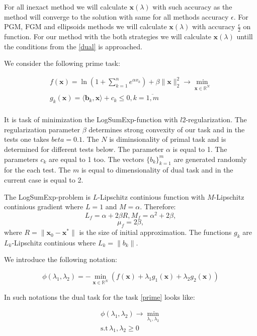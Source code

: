 \documentclass[12pt]{article}
\begin{document}
For all inexact method we will calculate $\textbf{x}(\lambda)$ with such accuracy as the method will converge to the solution with same for all methods accuracy $\epsilon$. For PGM, FGM and ellipsoids methods we will calculate $\textbf{x}(\lambda)$ with accuracy $\frac{\epsilon}{2}$ on function. For our method with the both strategies we will calculate $\textbf{x}(\lambda)$ untill the conditions from the \ref{dual} is approached.


We consider the following prime task:

\begin{gather}
\label{prime}
f(\textbf{x}) = \ln \left(1+\sum_{k=1}^ne^{\alpha x_k}\right) + \beta\|\textbf{x}\|_2^2\rightarrow \min\limits_{\textbf{x}\in \mathbb{R}^N}\\
g_k(\textbf{x}) = \langle \textbf{b}_k, \textbf{x}\rangle+c_k\leq0, k = \overline{1,m}\\
\end{gather}

It is task of minimization the LogSumExp-function with $l2$-regularization. The regularization parameter $\beta$ determines strong convexity of our task and in the tests one takes $beta=0.1$. The $N$ is diminsionality of primal task and is determined for different tests below. The parameter $\alpha$ is equal to 1. The parameters $c_k$ are equal to 1 too. The vectors $\{b_k\}_{k=1}^m$ are generated randomly for the each test. The $m$ is equal to dimensionality of dual task and in the current case is equal to 2.

The LogSumExp-problem is $L$-Lipschitz continious function with $M$-Lipschitz continious gradient where $L=1$ and $M=\alpha$. Therefore:
$$L_f = \alpha+2\beta R, M_f = \alpha^2 + 2\beta,$$
$$\mu_f = 2\beta,$$
where $R=\|\textbf{x}_0-\textbf{x}^*\|$ is the size of initial approximation. The functions $g_k$ are $L_k$-Lipschitz continious where $L_k=\|b_k\|$. 

We introduce the following notation:

\begin{equation}
\label{phi}
\phi(\lambda_1, \lambda_2) = -\min\limits_{\textbf{x}\in \mathbb{R}^N}\left(f(\textbf{x}) +\lambda_1 g_1(\textbf{x}) +\lambda_2g_2(\textbf{x})\right)
\end{equation}

In such notations the dual task for the task \ref{prime} looks like:

\begin{gather}
\phi(\lambda_1, \lambda_2) \rightarrow \min\limits_{\lambda_1, \lambda_2}\\
\text{s.t}\, \lambda_1, \lambda_2 \geq 0
\end{gather}
 
\end{document}
